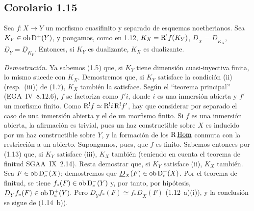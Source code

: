 \subsection*{Corolario 1.15}
Sea $f : X \to Y$ un morfismo cuasifinito y separado de esquemas noetherianos. Sea $K_Y \in \operatorname{ob} \mathrm{D}^{+}(Y)$, y pongamos, como en 1.12, $K_X = \mathrm{R}^{!}f(K_Y)$, $\underline{D}_X = \underline{D}_{K_X}$, $\underline{D}_Y = \underline{D}_{K_Y}$. Entonces, si $K_Y$ es dualizante, $K_X$ es dualizante.

\emph{Demostración.} Ya sabemos (1.5) que, si $K_Y$ tiene dimensión cuasi-inyectiva finita, lo mismo sucede con $K_X$. Demostremos que, si $K_Y$ satisface la condición (ii) (resp.~(iii)) de (1.7), $K_X$ también la satisface. Según el \textquotedblleft teorema principal\textquotedblright{} (EGA~IV~8.12.6), $f$ se factoriza como $f'i$, donde $i$ es una inmersión abierta y $f'$ un morfismo finito. Como $\mathrm{R}^{!}f \simeq \mathrm{R}^{!}i \, \mathrm{R}^{!}f'$, hay que considerar por separado el caso de una inmersión abierta y el de un morfismo finito. Si $f$ es una inmersión abierta, la afirmación es trivial, pues un haz constructible sobre $X$ es inducido por un haz constructible sobre $Y$, y la formación de los $\mathrm{R}\,\underline{\operatorname{Hom}}$ conmuta con la restricción a un abierto. Supongamos, pues, que $f$ es finito. Sabemos entonces por (1.13) que, si $K_Y$ satisface (iii), $K_X$ también (teniendo en cuenta el teorema de finitud SGAA~IX~2.14). Resta demostrar que, si $K_Y$ satisface (ii), $K_X$ también. Sea $F \in \operatorname{ob} \mathrm{D}_c^{-}(X)$; demostremos que $\underline{D}_X(F) \in \operatorname{ob} \mathrm{D}_c^{+}(X)$. Por el teorema de finitud, se tiene $f_{*}(F) \in \operatorname{ob} \mathrm{D}_c^{-}(Y)$ y, por tanto, por hipótesis, $\underline{D}_Y f_{*}(F) \in \operatorname{ob} \mathrm{D}_c^{+}(Y)$. Pero $\underline{D}_Y f_{*}(F) \simeq f_{*}\underline{D}_X(F)$ (1.12~a)(i)), y la conclusión se sigue de (1.14~b)).

